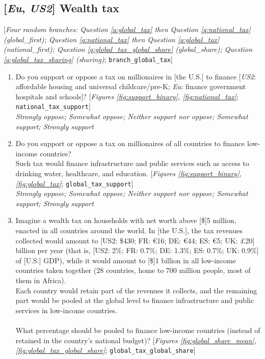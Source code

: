 \subsection*{[\textit{Eu}, \textit{US2}] Wealth tax}
[\textit{Four random branches: Question \ref{q:global_tax} then Question \ref{q:national_tax} (global\_first); Question \ref{q:national_tax} then Question \ref{q:global_tax} (national\_first); Question \ref{q:global_tax_global_share} (global\_share); Question \ref{q:global_tax_sharing} (sharing)}; \verb|branch_global_tax|] 
\begin{enumerate}[resume] 
   \item  \label{q:national_tax} Do you support or oppose a tax on millionaires in [the U.S.] to finance [\textit{US2}: affordable housing and universal childcare/pre-K; \textit{Eu}: finance government hospitals and schools]?  [\textit{Figures \ref{fig:support_binary},  \ref{fig:national_tax}}; \verb|national_tax_support|]
  \\ \textit{Strongly oppose; Somewhat oppose; Neither support nor oppose; Somewhat support; Strongly support}
  \item  \label{q:global_tax} Do you support or oppose a tax on millionaires of all countries to finance low-income countries? \\
  Such tax would finance infrastructure and public services such as access to drinking water, healthcare, and education. [\textit{Figures \ref{fig:support_binary}, \ref{fig:global_tax}}; \verb|global_tax_support|]
 \\ \textit{Strongly oppose; Somewhat oppose; Neither support nor oppose; Somewhat support; Strongly support}
  \item  \label{q:global_tax_global_share} Imagine a wealth tax on households with net worth above [\$]5 million, enacted in all countries around the world.  
  In [the U.S.], the tax revenues collected would amount to [US2: \$430; FR: \euro{}16; DE: \euro{}44; ES: \euro{}5; UK: £20] billion per year (that is, [US2: 2\%; FR: 0.7\%; DE: 1.3\%; ES: 0.7\%; UK: 0.9\%] of [U.S.] GDP), while it would amount to [\$]1 billion in all low-income countries taken together (28 countries, home to 700 million people, most of them in Africa).  \\
  Each country would retain part of the revenues it collects, and the remaining part would be pooled at the global level to finance infrastructure and public services in low-income countries.  \\
     \\
  What percentage should be pooled to finance low-income countries (instead of retained in the country's national budget)?  [\textit{Figures \ref{fig:global_share_mean}, \ref{fig:global_tax_global_share}}; \verb|global_tax_global_share|]

\end{enumerate}
